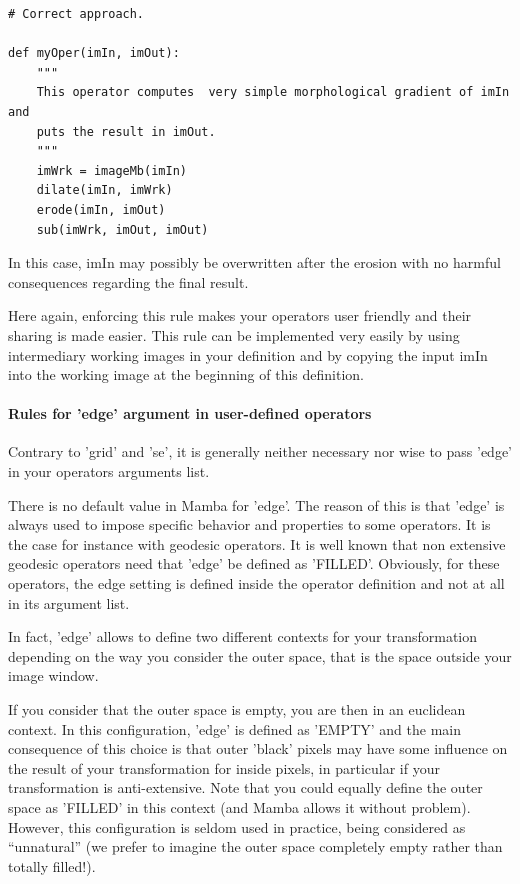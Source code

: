 \documentclass[a4paper,10pt,oneside]{article}
\begin{document}
\lstset{language=Python}
\begin{lstlisting}
# Correct approach.

def myOper(imIn, imOut):
    """
    This operator computes  very simple morphological gradient of imIn and
    puts the result in imOut.
    """
    imWrk = imageMb(imIn)
    dilate(imIn, imWrk)
    erode(imIn, imOut)
    sub(imWrk, imOut, imOut)
\end{lstlisting}

In this case, imIn may possibly be overwritten after the erosion with no harmful 
consequences regarding the final result.

Here again, enforcing this rule makes your operators user friendly and their 
sharing is made easier. This rule can be implemented very easily by using 
intermediary working images in your definition and by copying the input imIn 
into the working image at the beginning of this definition. 


\paragraph{Rules for 'edge' argument in user-defined operators}

Contrary to 'grid' and 'se', it is generally neither necessary nor wise  to 
pass 'edge' in your operators arguments list. 

There is no default value in Mamba for 'edge'. The reason of this is that 'edge' 
is always used to impose specific behavior and properties to some operators. 
It is the case for instance with geodesic operators.  It is well known that non 
extensive geodesic operators need that 'edge' be defined as 'FILLED'. Obviously, 
for these operators, the edge setting is defined inside the operator definition 
and not at all in its argument list.

In fact, 'edge' allows to define two different contexts for your transformation 
depending on the way you consider the outer space, that is the space outside 
your image window.

If you consider that the outer space is empty, you are then in an euclidean 
context. In this configuration, 'edge' is defined as 'EMPTY' and the main 
consequence of this choice is that outer 'black' pixels may have some influence 
on the result of your transformation for inside pixels, in particular if your 
transformation is anti-extensive. Note that you could equally define the outer 
space as 'FILLED' in this context (and Mamba allows it without problem). 
However, this configuration is seldom used in practice, being considered as 
``unnatural'' (we prefer to imagine the outer space completely empty rather 
than totally filled!).
\end{document}
